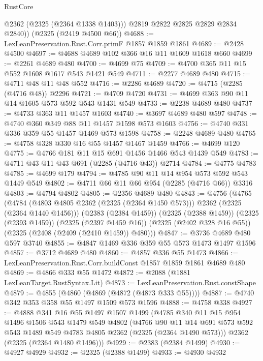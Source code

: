\begin{lexlean}{RustCore}
\begin{coremodule}
          @2362
          (@2325 (@2364 @1338 @1403)))
        @2819
        @2822
        @2825
        @2829
        @2834
        @2840))
    (@2325 (@2419 @4500 @66))
@4688 := LexLeanPreservation.Rust.Corr.primF @1857 @1859 @1861
@4689 := @2428 @4500
@4697 := @4688 @4689 @102 @366 @16 @11 @1609 @1618 @660
@4699 := @2261 @4689 @480
@4700 := @4699 @75
@4709 := @4700 @365 @11 @15 @552 @1608 @1617 @543 @1421 @549
@4711 := @2277 @4689 @480
@4715 := @4711 @48 @11 @48 @552
@4716 := @2286 @4689
@4720 := @4715 (@2285 (@4716 @48)) @2296
@4721 := @4709 @4720
@4731 := @4699 @363 @90 @11 @14 @1605 @573 @592 @543 @1431 @549
@4733 := @2238 @4689 @480
@4737 := @4733 @363 @11 @1457 @1603
@4740 := @3697 @4689 @480 @597
@4748 := @4740 @360 @349 @88 @11 @1457 @1598 @573 @1603
@4756 := @4740 @331 @336 @359 @55 @1457 @1469 @573 @1598
@4758 := @2248 @4689 @480
@4765 := @4758 @328 @330 @16 @55 @1457 @1467 @1459
@4766 := @4699 @120
@4775 := @4766 @181 @11 @15 @691 @1456 @1466 @543 @1439 @549
@4783 := @4711 @43 @11 @43 @691 (@2285 (@4716 @43)) @2714
@4784 := @4775 @4783
@4785 := @4699 @179
@4794 := @4785 @90 @11 @14 @954 @573 @592 @543 @1449 @549
@4802 := @4711 @66 @11 @66 @954 (@2285 (@4716 @66)) @3316
@4803 := @4794 @4802
@4805 := @2356 @4689 @480
@4843 := @4756
    (@4765
      (@4784 (@4803 @4805 @2362 (@2325 (@2364 @1450 @573))) @2362 (@2325 (@2364 @1440 @1456)))
      (@2383 (@2384 @1459))
      (@2325 (@2388 @1459))
      (@2325 (@2393 @1459))
      (@2325 (@2397 @1459 @16))
      (@2325 (@2402 @328 @16 @55))
      (@2325 (@2408 (@2409 (@2410 @1459)) @480)))
@4847 := @3736 @4689 @480 @597 @3740
@4855 := @4847 @1469 @336 @359 @55 @573 @1473 @1497 @1596
@4857 := @3712 @4689 @480
@4860 := @4857 @336 @55 @1473
@4866 := LexLeanPreservation.Rust.Corr.buildConst @1857 @1859 @1861 @4689 @480
@4869 := @4866 @333 @55 @1472
@4872 := @2088 (@1881 LexLeanTarget.RustSyntax.Lit)
@4873 := LexLeanPreservation.Rust.constShape
@4879 := @4855 (@4860 (@4869 (@4872 (@4873 @333 @55))))
@4887 := @4740 @342 @353 @358 @55 @1497 @1509 @573 @1596
@4888 := @4758 @338
@4927 := @4888
    @341
    @16
    @55
    @1497
    @1507
    @1499
    (@4785
      @340
      @11
      @15
      @954
      @1496
      @1506
      @543
      @1479
      @549
      @4802
      (@4766
        @90
        @11
        @14
        @691
        @573
        @592
        @543
        @1489
        @549
        @4783
        @4805
        @2362
        (@2325 (@2364 @1490 @573)))
      @2362
      (@2325 (@2364 @1480 @1496)))
@4929 := @2383 (@2384 @1499)
@4930 := @4927 @4929
@4932 := @2325 (@2388 @1499)
@4933 := @4930 @4932

\end{coremodule}
\end{lexlean}
